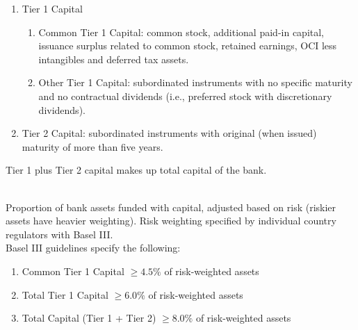 \begin{definition} 
\begin{enumerate}[label=\roman*.]
\setlength{\itemsep}{0pt}
\item Tier 1 Capital
\begin{enumerate}[label=\arabic*.]
\setlength{\itemsep}{0pt}
\item Common Tier 1 Capital: common stock, additional paid-in capital, issuance surplus related to common stock, retained earnings, OCI less intangibles and deferred tax assets.
\item Other Tier 1 Capital: subordinated instruments with no specific maturity and no contractual dividends (i.e., preferred stock with discretionary dividends).
\end{enumerate}
\item Tier 2 Capital: subordinated instruments with original (when issued) maturity of more than five years.
\end{enumerate}
Tier 1 plus Tier 2 capital makes up total capital of the bank.
\end{definition}

\begin{definition} \\
Proportion of bank assets funded with capital, adjusted based on risk (riskier assets have heavier weighting). Risk weighting specified by individual country regulators with Basel III.\\
Basel III guidelines specify the following:
\begin{enumerate}[label=\roman*.]
\setlength{\itemsep}{0pt}
\item Common Tier 1 Capital $\geq 4.5\%$ of risk-weighted assets
\item Total Tier 1 Capital $\geq 6.0\%$ of risk-weighted assets
\item Total Capital (Tier 1 + Tier 2) $\geq 8.0\%$ of risk-weighted assets
\end{enumerate}
\end{definition}

